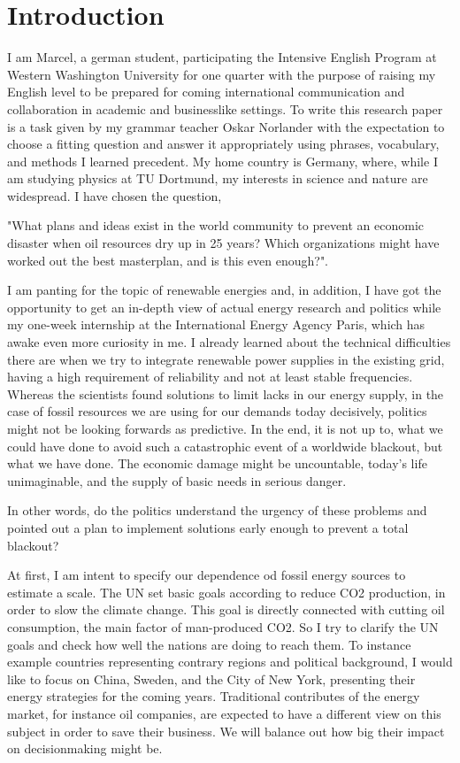 \section{Introduction}%
\label{sec:introduction}
I am Marcel, a german student, participating the Intensive English Program at Western Washington University for one quarter
with the purpose of raising my English level to be prepared for coming international communication and collaboration in 
academic and businesslike settings.
To write this research paper is a task given by my grammar teacher Oskar Norlander with the expectation to choose a fitting 
question and answer it appropriately using phrases, vocabulary, and methods I learned precedent.
My home country is Germany, where, while I am studying physics at TU Dortmund, my interests in science and nature
are widespread. I have chosen the question, \par
"What plans and ideas exist in the world community to prevent an economic 
disaster when oil resources dry up in 25 years?\cite[14]{BP}\cite{Industries} Which organizations 
might have worked out the best masterplan, and is this even enough?". \par
I am panting for the topic of renewable energies and, in addition, I have got the opportunity to get an in-depth view
of actual energy research and politics while my one-week internship at the International Energy Agency Paris, which has awake even
more curiosity in me. 
I already learned about the technical difficulties there are when we try to integrate renewable power supplies in the existing grid,
having a high requirement of reliability and not at least stable frequencies\cite{inertia}.
Whereas the scientists found solutions to limit lacks in our energy supply, in the case of fossil resources we are using for our demands today decisively,
politics might not be looking forwards as predictive.
In the end, it is not up to, what we could have done to avoid such a catastrophic event of a worldwide blackout, but what we have done.
The economic damage might be uncountable, today's life unimaginable, and the supply of basic needs in serious danger.\par
In other words, do the politics understand the urgency of these problems and pointed out a plan to implement solutions early enough to prevent a total blackout? \par
At first, I am intent to specify our dependence od fossil energy sources to estimate a scale.
The UN set basic goals according to reduce CO2 production, in order to slow the climate change. 
This goal is directly connected with cutting oil consumption, the main factor of man-produced CO2\cite{OILCombustion}.
So I try to clarify the UN goals and check how well the nations are doing to reach them.
To instance example countries representing contrary regions and political background, I would like to
focus on China, Sweden, and the City of New York, presenting their energy strategies for the coming years.
Traditional contributes of the energy market, for instance oil companies, are expected to have a different view on this subject in order to save their business.
We will balance out how big their impact on decisionmaking might be.
